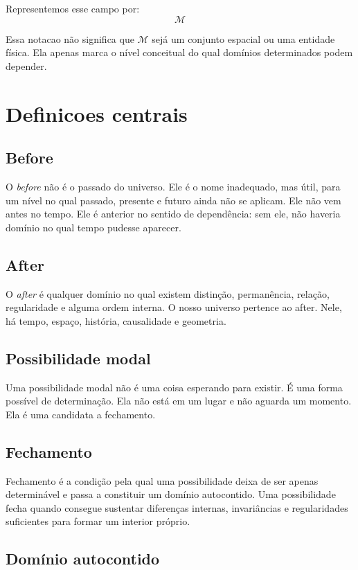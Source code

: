 \documentclass[11pt,a4paper]{article}
\newcommand{\CMP}{\mathcal{M}}
\begin{document}
Representemos esse campo por:
\[
\CMP
\]

Essa notacao não significa que \(\CMP\) sejá um conjunto espacial ou uma entidade física. Ela apenas marca o nível conceitual do qual domínios determinados podem depender.

\section{Definicoes centrais}

\subsection{Before}

O \emph{before} não é o passado do universo. Ele é o nome inadequado, mas útil, para um nível no qual passado, presente e futuro ainda não se aplicam. Ele não vem antes no tempo. Ele é anterior no sentido de dependência: sem ele, não haveria domínio no qual tempo pudesse aparecer.

\subsection{After}

O \emph{after} é qualquer domínio no qual existem distinção, permanência, relação, regularidade e alguma ordem interna. O nosso universo pertence ao after. Nele, há tempo, espaço, história, causalidade e geometria.

\subsection{Possibilidade modal}

Uma possibilidade modal não é uma coisa esperando para existir. É uma forma possível de determinação. Ela não está em um lugar e não aguarda um momento. Ela é uma candidata a fechamento.

\subsection{Fechamento}

Fechamento é a condição pela qual uma possibilidade deixa de ser apenas determinável e passa a constituir um domínio autocontido. Uma possibilidade fecha quando consegue sustentar diferenças internas, invariâncias e regularidades suficientes para formar um interior próprio.

\subsection{Domínio autocontido}
\end{document}
